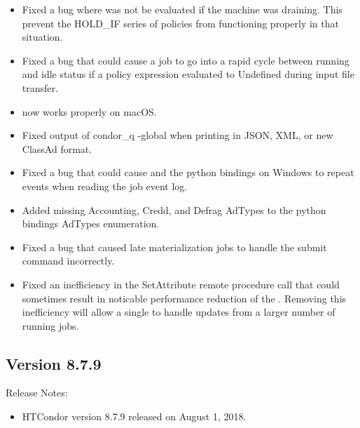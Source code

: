 \begin{itemize}

\item Fixed a bug where  was not be evaluated if the
machine was draining.  This prevent the HOLD\_IF series of policies from
functioning properly in that situation.

\item Fixed a bug that could cause a job to go into a rapid cycle
between running and idle status if a policy expression evaluated to
Undefined during input file transfer.

\item {} now works properly on macOS.

\item Fixed output of condor\_q -global when printing in JSON, XML, or
new ClassAd format.

\item Fixed a bug that could cause  and the python bindings
on Windows to repeat events when reading the job event log.

\item Added missing Accounting, Credd, and Defrag AdTypes to the python bindings
AdTypes enumeration.

\item Fixed a bug that caused late materialization jobs to handle the 
submit command incorrectly.

\item Fixed an inefficiency in the SetAttribute remote procedure call that could sometimes
result in noticable performance reduction of the .  Removing this inefficiency
will allow a single  to handle updates from a larger number of running jobs.

\end{itemize}

\subsection*{\label{sec:New-8-7-9}Version 8.7.9}

\noindent Release Notes:

\begin{itemize}

\item HTCondor version 8.7.9 released on August 1, 2018.

\end{itemize}


